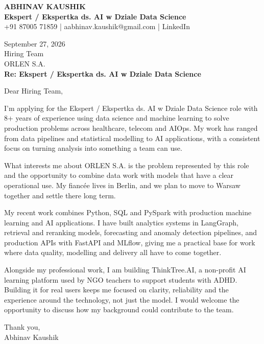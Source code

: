 \documentclass[10pt,a4paper]{article}
\begin{document}
\begin{center}
{\Large\bfseries ABHINAV KAUSHIK}\\[2pt]
{\bfseries Ekspert / Ekspertka ds. AI w Dziale Data Science}\\[2pt]
+91 87005 71859 \quad | \quad aabhinav.kaushik@gmail.com \quad | \quad LinkedIn
\end{center}
\vspace{8pt}
September 27, 2026\\[6pt]
Hiring Team\\
ORLEN S.A.\\[4pt]
\textbf{Re: Ekspert / Ekspertka ds. AI w Dziale Data Science}

Dear Hiring Team,

I’m applying for the Ekspert / Ekspertka ds. AI w Dziale Data Science role with 8+ years of experience using data science and machine learning to solve production problems across healthcare, telecom and AIOps. My work has ranged from data pipelines and statistical modelling to AI applications, with a consistent focus on turning analysis into something a team can use.

What interests me about ORLEN S.A. is the problem represented by this role and the opportunity to combine data work with models that have a clear operational use. My fiancée lives in Berlin, and we plan to move to Warsaw together and settle there long term.

My recent work combines Python, SQL and PySpark with production machine learning and AI applications. I have built analytics systems in LangGraph, retrieval and reranking models, forecasting and anomaly detection pipelines, and production APIs with FastAPI and MLflow, giving me a practical base for work where data quality, modelling and delivery all have to come together.

Alongside my professional work, I am building ThinkTree.AI, a non-profit AI learning platform used by NGO teachers to support students with ADHD. Building it for real users keeps me focused on clarity, reliability and the experience around the technology, not just the model. I would welcome the opportunity to discuss how my background could contribute to the team.

Thank you,\\
Abhinav Kaushik
\end{document}
